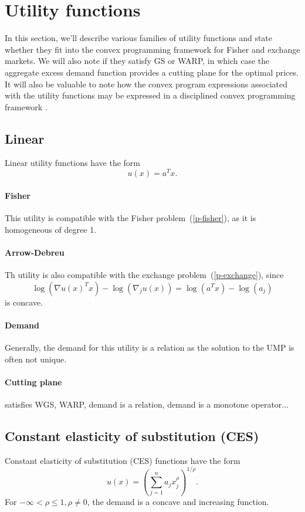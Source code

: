 \documentclass[12pt]{article}
\begin{document}
\section{Utility functions}
In this section, we'll describe various families of utility functions
and state whether they fit into the convex programming framework
for Fisher and exchange markets. We will also note if they
satisfy GS or WARP, in which case the aggregate excess demand function
provides a cutting plane for the optimal prices. It will also
be valuable to note how the convex program expressions associated
with the utility functions may be expressed in a disciplined
convex programming framework \cite{grant2006disciplined}.


\subsection{Linear}
Linear utility functions have the form
\[
u(x) = a^T x.
\]

\paragraph{Fisher}
This utility is compatible with the Fisher problem~(\ref{p-fisher}), as it is homogeneous of degree 1.

\paragraph{Arrow-Debreu}
Th utility is also compatible with the exchange problem~(\ref{p-exchange}),
since
\[
\log(\nabla u(x)^T x) - \log(\nabla_j u(x))  = \log(a^T x) - \log(a_j)
\]
is concave.

\paragraph{Demand}
Generally, the demand for this utility is a relation as the solution
to the UMP is often not unique.

\paragraph{Cutting plane}
satisfies WGS, WARP, demand is a relation, demand is a monotone operator...

\subsection{Constant elasticity of substitution (CES)}
Constant elasticity of substitution (CES) functions have the form
\[
u(x) = \left(\sum_{j=1}^n a_j x_j^\rho \right)^{1/\rho}.
\]
For $-\infty < \rho \leq 1, \rho \neq 0$, the demand is a concave and
increasing function.
\end{document}
